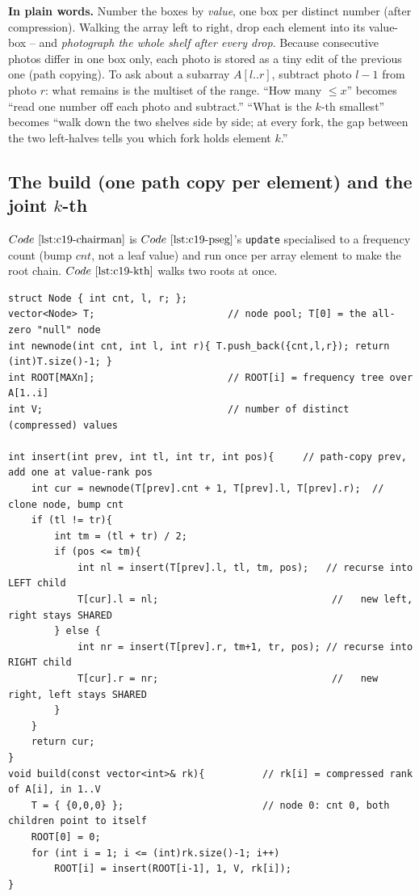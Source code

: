 \noindent\textbf{In plain words.}  Number the boxes by \emph{value}, one box per distinct number (after compression). Walking the array left to right, drop each element into its value-box -- and \emph{photograph the whole shelf after every drop}. Because consecutive photos differ in one box only, each photo is stored as a tiny edit of the previous one (path copying). To ask about a subarray \(A[l..r]\), subtract photo \(l-1\) from photo \(r\): what remains is the multiset of the range. ``How many \(\le x\)'' becomes ``read one number off each photo and subtract.'' ``What is the \(k\)-th smallest'' becomes ``walk down the two shelves side by side; at every fork, the gap between the two left-halves tells you which fork holds element \(k\).''

\subsection{The build (one path copy per element) and the joint \(k\)-th}

\(\coderef{c19-chairman}\) is \(\coderef{c19-pseg}\)'s \texttt{update} specialised to a frequency count (bump \(\mathit{cnt}\), not a leaf value) and run once per array element to make the root chain. \(\coderef{c19-kth}\) walks two roots at once.

\begin{lstlisting}[caption={chairman build: node pool with a shared null at index 0; ROOT(i) = ROOT(i-1) with one path copy inserting rank(A(i)); O(log V) new nodes per element}, label={lst:c19-chairman}]
struct Node { int cnt, l, r; };
vector<Node> T;                       // node pool; T[0] = the all-zero "null" node
int newnode(int cnt, int l, int r){ T.push_back({cnt,l,r}); return (int)T.size()-1; }
int ROOT[MAXn];                       // ROOT[i] = frequency tree over A[1..i]
int V;                                // number of distinct (compressed) values

int insert(int prev, int tl, int tr, int pos){     // path-copy prev, add one at value-rank pos
    int cur = newnode(T[prev].cnt + 1, T[prev].l, T[prev].r);  // clone node, bump cnt
    if (tl != tr){
        int tm = (tl + tr) / 2;
        if (pos <= tm){
            int nl = insert(T[prev].l, tl, tm, pos);   // recurse into LEFT child
            T[cur].l = nl;                              //   new left, right stays SHARED
        } else {
            int nr = insert(T[prev].r, tm+1, tr, pos); // recurse into RIGHT child
            T[cur].r = nr;                              //   new right, left stays SHARED
        }
    }
    return cur;
}
void build(const vector<int>& rk){          // rk[i] = compressed rank of A[i], in 1..V
    T = { {0,0,0} };                        // node 0: cnt 0, both children point to itself
    ROOT[0] = 0;
    for (int i = 1; i <= (int)rk.size()-1; i++)
        ROOT[i] = insert(ROOT[i-1], 1, V, rk[i]);
}
\end{lstlisting}

